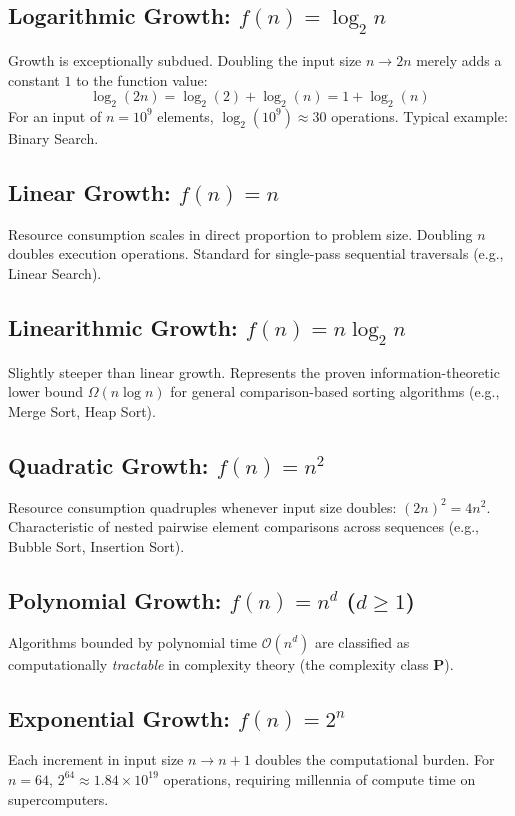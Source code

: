 \subsection{Logarithmic Growth: $f(n) = \log_2 n$}
Growth is exceptionally subdued. Doubling the input size $n \to 2n$ merely adds a constant $1$ to the function value:
$$\log_2(2n) = \log_2(2) + \log_2(n) = 1 + \log_2(n)$$
For an input of $n = 10^9$ elements, $\log_2(10^9) \approx 30$ operations. Typical example: Binary Search.

\subsection{Linear Growth: $f(n) = n$}
Resource consumption scales in direct proportion to problem size. Doubling $n$ doubles execution operations. Standard for single-pass sequential traversals (e.g., Linear Search).

\subsection{Linearithmic Growth: $f(n) = n \log_2 n$}
Slightly steeper than linear growth. Represents the proven information-theoretic lower bound $\Omega(n \log n)$ for general comparison-based sorting algorithms (e.g., Merge Sort, Heap Sort).

\subsection{Quadratic Growth: $f(n) = n^2$}
Resource consumption quadruples whenever input size doubles: $(2n)^2 = 4n^2$. Characteristic of nested pairwise element comparisons across sequences (e.g., Bubble Sort, Insertion Sort).

\subsection{Polynomial Growth: $f(n) = n^d$ ($d \ge 1$)}
Algorithms bounded by polynomial time $\mathcal{O}(n^d)$ are classified as computationally \emph{tractable} in complexity theory (the complexity class $\mathbf{P}$).

\subsection{Exponential Growth: $f(n) = 2^n$}
Each increment in input size $n \to n + 1$ doubles the computational burden. For $n = 64$, $2^{64} \approx 1.84 \times 10^{19}$ operations, requiring millennia of compute time on supercomputers.

